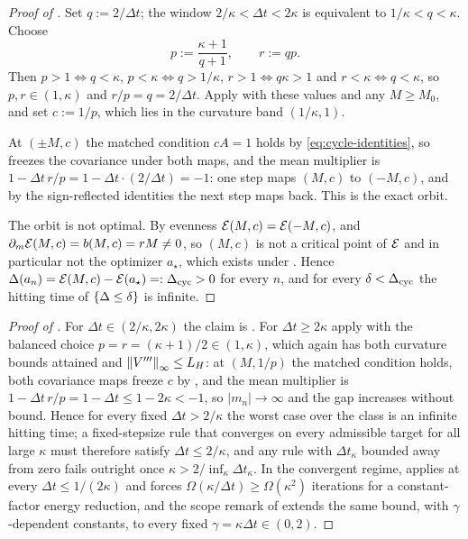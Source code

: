 \begin{proof}[Proof of ]
    Set $q:=2/\Delta t$; the window $2/\kappa<\Delta t<2\kappa$ is equivalent to
    $1/\kappa<q<\kappa$. Choose
    \begin{equation}\label{eq:cycle-pr}
        p:=\frac{\kappa+1}{q+1},
        \qquad
        r:=qp .
    \end{equation}
    Then $p>1\iff q<\kappa$, $p<\kappa\iff q>1/\kappa$, $r>1\iff q\kappa>1$ and
    $r<\kappa\iff q<\kappa$, so $p,r\in(1,\kappa)$ and $r/p=q=2/\Delta t$. Apply
     with these values and any $M\geq M_0$, and set $c:=1/p$, which
    lies in the curvature band $(1/\kappa,1)$.

    At $(\pm M,c)$ the matched condition $cA=1$ holds by \eqref{eq:cycle-identities}, so
     freezes the covariance under both maps, and the mean multiplier
    is $1-\Delta t\,r/p=1-\Delta t\cdot(2/\Delta t)=-1$: one step maps $(M,c)$ to $(-M,c)$,
    and by the sign-reflected identities the next step maps back. This is the exact orbit.

    The orbit is not optimal. By evenness $\mathcal{E}(M,c)=\mathcal{E}(-M,c)$, and
    $\partial_m\mathcal{E}(M,c)=b(M,c)=rM\neq0$, so $(M,c)$ is not a critical point of $\mathcal{E}$ and
    in particular not the optimizer $a_\star$, which exists under
    . Hence
    $\Delta(a_n)=\mathcal{E}(M,c)-\mathcal{E}(a_\star)=:\Delta_{\mathrm{cyc}}>0$ for every $n$, and for
    every $\delta<\Delta_{\mathrm{cyc}}$ the hitting time of $\{\Delta\leq\delta\}$ is
    infinite.
\end{proof}

\begin{proof}[Proof of ]
    For $\Delta t\in(2/\kappa,2\kappa)$ the claim is . For
    $\Delta t\geq2\kappa$ apply  with the balanced choice
    $p=r=(\kappa+1)/2\in(1,\kappa)$, which again has both curvature bounds attained and
    $\left\lVert V'''\right\rVert_\infty\leq L_H$: at $(M,1/p)$ the matched condition holds, both covariance
    maps freeze $c$ by , and the mean multiplier is
    $1-\Delta t\,r/p=1-\Delta t\leq1-2\kappa<-1$, so $|m_n|\to\infty$ and the gap increases
    without bound. Hence for every fixed $\Delta t>2/\kappa$ the
    worst case over the class is an infinite hitting time; a fixed-stepsize rule that
    converges on every admissible target for all large $\kappa$ must therefore satisfy
    $\Delta t\leq2/\kappa$, and any rule with $\Delta t_\kappa$ bounded away from zero fails
    outright once $\kappa>2/\inf_\kappa\Delta t_\kappa$. In the convergent regime,
     applies at every $\Delta t\leq1/(2\kappa)$ and forces
    $\Omega(\kappa/\Delta t)\geq\Omega(\kappa^2)$ iterations for a constant-factor energy
    reduction, and the scope remark of  extends the same bound, with
    $\gamma$-dependent constants, to every fixed $\gamma=\kappa\Delta t\in(0,2)$.
\end{proof}

